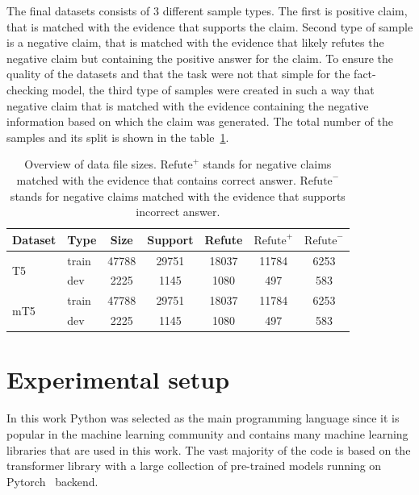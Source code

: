 The final datasets consists of 3 different sample types. The first is positive claim, that is matched with the evidence that supports the claim. Second type of sample is a negative claim, that is matched with the evidence that likely refutes the negative claim but containing the positive answer for the claim. To ensure the quality of the datasets and that the task were not that simple for the fact-checking model, the third type of samples were created in such a way that negative claim that is matched with the evidence containing the negative information based on which the claim was generated. The total number of the samples and its split is shown in the table~\ref{tab:dataset_stats}.

\begin{table}[h]
    \centering
    \begin{tabular}{l|l|ccccc}
        \hline
        Dataset & Type & Size & Support & Refute & $\text{Refute}^+$ & $\text{Refute}^-$ \\
        \hline
        \multirow{2}{*}{T5} & train & 47788 & 29751 & 18037 & 11784 & 6253 \\
        & dev & 2225 & 1145 & 1080 & 497 & 583 \\
        \multirow{2}{*}{mT5} & train & 47788 & 29751 & 18037 & 11784 & 6253 \\
        & dev & 2225 & 1145 & 1080 & 497 & 583 \\
        \hline
    \end{tabular}
    \caption{Overview of data file sizes. $\text{Refute}^+$ stands for negative claims matched with the evidence that contains correct answer. $\text{Refute}^-$ stands for negative claims matched with the evidence that supports incorrect answer.}
    \label{tab:dataset_stats}
\end{table}


\chapter{Experimental setup}\label{c6}
In this work Python was selected as the main programming language since it is popular in the machine learning community and contains many machine learning libraries that are used in this work. The vast majority of the code is based on the transformer library with a large collection of pre-trained models running on Pytorch~\cite{pytorch} backend.

